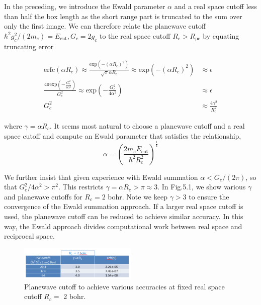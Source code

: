 \documentclass[paper=a4, fontsize=11pt]{article} %
\numberwithin{equation}{section} %
\numberwithin{figure}{section} %
\numberwithin{table}{section} %
\newcommand{\rexp}{{\mathrm{exp}}}
\newcommand{\rcut}{{\mathrm{cut}}}
\newcommand{\rerfc}{{\mathrm{erfc}}}
\newcommand{\al}{{\alpha}}
\newcommand{\Rpc}{{R_{\mathrm{pc}}}}
\begin{document}
In the preceding, we introduce the Ewald parameter $\al$ and a real space cutoff less than half the box length as the short range part is truncated to the sum over only the first image. We can therefore relate the planewave cutoff $\hbar^2 g_c^2 /(2m_e) = E_{\rcut}, G_c = 2g_c$ to the real space cutoff $R_c > \Rpc$ by equating truncating error

\begin{equation}
\begin{split}
\rerfc(\al R_c) \approx \frac{\rexp\left(-(\al R_c)^2\right)}{\sqrt{\pi}\al R_c} \approx \rexp\left(-(\al R_c)^2\right) &\approx \epsilon \\
\frac{4\pi \rexp\left(-\frac{G_c^2}{4\al^2}\right)}{G_c^2} \approx \rexp\left(-\frac{G_c^2}{4\al^2}\right) &\approx \epsilon\\
G_c^2 & \approx \frac{4\gamma^2}{R_c^2}
\end{split}
\end{equation}

where $\gamma = \al R_c$. It seems most natural to choose a planewave cutoff and a real space cutoff and compute an Ewald parameter that satisfies the relationship, 
\begin{equation}
\alpha = \left(\frac{2 m_e E_{\rcut}}{\hbar^2 R_c^2}\right)^{\frac{1}{4}}
\end{equation}

We further insist that given experience with Ewald summation $\al < G_c/(2\pi) $, so that $G_c^2 /4 \alpha^2 > \pi^2$. This restricts $\gamma = \al R_c > \pi \approx 3$. In Fig.5.1, we show various $\gamma$ and planewave cutoffs for $R_c = 2$ bohr. Note we keep $\gamma > 3$ to ensure the convergence of the Ewald summation approach. If a larger real space cutoff is used, the planewave cutoff can be reduced to achieve similar accuracy. In this way, the Ewald approach divides computational work between real space and reciprocal space.

\begin{figure}[h!] 
    \centering
    \includegraphics[width=0.5\textwidth]{alphatable}
    \caption{Planewave cutoff to achieve various accuracies at fixed real space cutoff $R_c = $ 2 bohr.} 
    \label{fig:alphatable}
\end{figure}
\end{document}

